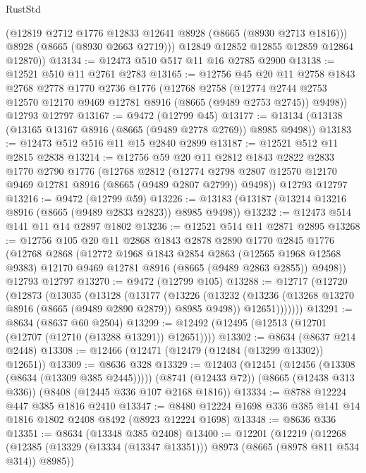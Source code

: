 \begin{lexlean}{RustStd}
\begin{coremodule}
          (@12819 @2712 @1776 @12833 @12641 @8928 (@8665 (@8930 @2713 @1816)))
          @8928
          (@8665 (@8930 @2663 @2719)))
        @12849
        @12852
        @12855
        @12859
        @12864
        @12870))
@13134 := @12473 @510 @517 @11 @16 @2785 @2900
@13138 := @12521 @510 @11 @2761 @2783
@13165 := @12756
    @45
    @20
    @11
    @2758
    @1843
    @2768
    @2778
    @1770
    @2736
    @1776
    (@12768
      @2758
      (@12774 @2744 @2753 @12570 @12170 @9469 @12781 @8916 (@8665 (@9489 @2753 @2745)) @9498))
    @12793
    @12797
@13167 := @9472 (@12799 @45)
@13177 := @13134 (@13138 (@13165 @13167 @8916 (@8665 (@9489 @2778 @2769)) @8985 @9498))
@13183 := @12473 @512 @516 @11 @15 @2840 @2899
@13187 := @12521 @512 @11 @2815 @2838
@13214 := @12756
    @59
    @20
    @11
    @2812
    @1843
    @2822
    @2833
    @1770
    @2790
    @1776
    (@12768
      @2812
      (@12774 @2798 @2807 @12570 @12170 @9469 @12781 @8916 (@8665 (@9489 @2807 @2799)) @9498))
    @12793
    @12797
@13216 := @9472 (@12799 @59)
@13226 := @13183 (@13187 (@13214 @13216 @8916 (@8665 (@9489 @2833 @2823)) @8985 @9498))
@13232 := @12473 @514 @141 @11 @14 @2897 @1802
@13236 := @12521 @514 @11 @2871 @2895
@13268 := @12756
    @105
    @20
    @11
    @2868
    @1843
    @2878
    @2890
    @1770
    @2845
    @1776
    (@12768
      @2868
      (@12772
        @1968
        @1843
        @2854
        @2863
        (@12565 @1968 @12568 @9383)
        @12170
        @9469
        @12781
        @8916
        (@8665 (@9489 @2863 @2855))
        @9498))
    @12793
    @12797
@13270 := @9472 (@12799 @105)
@13288 := @12717
    (@12720
      (@12873
        (@13035
          (@13128
            (@13177
              (@13226
                (@13232
                  (@13236 (@13268 @13270 @8916 (@8665 (@9489 @2890 @2879)) @8985 @9498))
                  @12651)))))))
@13291 := @8634 (@8637 @60 @2504)
@13299 := @12492 (@12495 (@12513 (@12701 (@12707 (@12710 (@13288 @13291)) @12651))))
@13302 := @8634 (@8637 @214 @2448)
@13308 := @12466 (@12471 (@12479 (@12484 (@13299 @13302)) @12651))
@13309 := @8636 @328
@13329 := @12403
    (@12451 (@12456 (@13308 (@8634 (@13309 @385 @2445)))))
    (@8741 (@12433 @72))
    (@8665 (@12438 @313 @336))
    (@8408 (@12445 @336 @107 @2168 @1816))
@13334 := @8788 @12224 @447 @385 @1816 @2410
@13347 := @8480 @12224 @1698 @336 @385 @141 @14 @1816 @1802 @2408 @8492 (@8923 @12224 @1698)
@13348 := @8636 @336
@13351 := @8634 (@13348 @385 @2408)
@13400 := @12201
    (@12219
      (@12268 (@12385 (@13329 (@13334 (@13347 @13351))) @8973 (@8665 (@8978 @811 @534 @314)) @8985))

\end{coremodule}
\end{lexlean}
